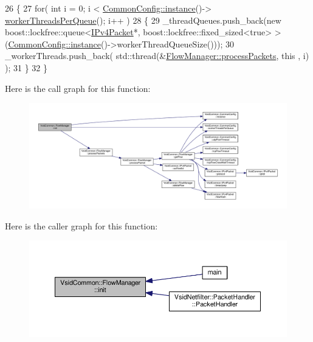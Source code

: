 \begin{DoxyCode}
26 \{
27     \textcolor{keywordflow}{for}( \textcolor{keywordtype}{int} i = 0; i < \hyperlink{class_vsid_common_1_1_common_config_a69c29458a786be527fe66470ac9fbbdb}{CommonConfig::instance}()->
      \hyperlink{class_vsid_common_1_1_common_config_a7ef125a1ecf4a659355d83c2531a49e9}{workerThreadsPerQueue}(); i++ )
28     \{
29         \_threadQueues.push\_back(\textcolor{keyword}{new} boost::lockfree::queue<\hyperlink{class_vsid_common_1_1_i_pv4_packet}{IPv4Packet}*, 
      boost::lockfree::fixed\_sized<true> >(\hyperlink{class_vsid_common_1_1_common_config_a69c29458a786be527fe66470ac9fbbdb}{CommonConfig::instance}()->workerThreadQueueSize()));
30         \_workerThreads.push\_back( std::thread(&\hyperlink{class_vsid_common_1_1_flow_manager_a73e959f27b2b196694b94cb73b09143d}{FlowManager::processPackets}, \textcolor{keyword}{this}
      , i) );
31     \}
32 \}
\end{DoxyCode}


Here is the call graph for this function\-:
\nopagebreak
\begin{figure}[H]
\begin{center}
\leavevmode
\includegraphics[width=350pt]{class_vsid_common_1_1_flow_manager_a49fc9f26f20cb8b963dcf28a704f5861_cgraph}
\end{center}
\end{figure}




Here is the caller graph for this function\-:
\nopagebreak
\begin{figure}[H]
\begin{center}
\leavevmode
\includegraphics[width=350pt]{class_vsid_common_1_1_flow_manager_a49fc9f26f20cb8b963dcf28a704f5861_icgraph}
\end{center}
\end{figure}


